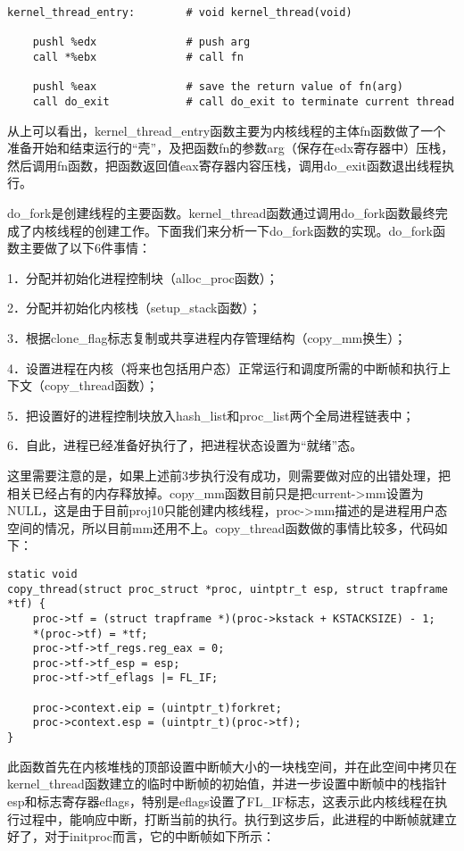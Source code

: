 \begin{lstlisting}
kernel_thread_entry:        # void kernel_thread(void)

    pushl %edx              # push arg
    call *%ebx              # call fn

    pushl %eax              # save the return value of fn(arg)
    call do_exit            # call do_exit to terminate current thread
\end{lstlisting}

从上可以看出，kernel\_thread\_entry函数主要为内核线程的主体fn函数做了一个准备开始和结束运行的``壳''，及把函数fn的参数arg（保存在edx寄存器中）压栈，然后调用fn函数，把函数返回值eax寄存器内容压栈，调用do\_exit函数退出线程执行。

do\_fork是创建线程的主要函数。kernel\_thread函数通过调用do\_fork函数最终完成了内核线程的创建工作。下面我们来分析一下do\_fork函数的实现。do\_fork函数主要做了以下6件事情：

1．分配并初始化进程控制块（alloc\_proc函数）；

2．分配并初始化内核栈（setup\_stack函数）；

3．根据clone\_flag标志复制或共享进程内存管理结构（copy\_mm换生）；

4．设置进程在内核（将来也包括用户态）正常运行和调度所需的中断帧和执行上下文（copy\_thread函数）；

5．把设置好的进程控制块放入hash\_list和proc\_list两个全局进程链表中；

6．自此，进程已经准备好执行了，把进程状态设置为``就绪''态。

这里需要注意的是，如果上述前3步执行没有成功，则需要做对应的出错处理，把相关已经占有的内存释放掉。copy\_mm函数目前只是把current-\textgreater{}mm设置为NULL，这是由于目前proj10只能创建内核线程，proc-\textgreater{}mm描述的是进程用户态空间的情况，所以目前mm还用不上。copy\_thread函数做的事情比较多，代码如下：

\begin{lstlisting}
static void
copy_thread(struct proc_struct *proc, uintptr_t esp, struct trapframe *tf) {
    proc->tf = (struct trapframe *)(proc->kstack + KSTACKSIZE) - 1;
    *(proc->tf) = *tf;
    proc->tf->tf_regs.reg_eax = 0;
    proc->tf->tf_esp = esp;
    proc->tf->tf_eflags |= FL_IF;

    proc->context.eip = (uintptr_t)forkret;
    proc->context.esp = (uintptr_t)(proc->tf);
}
\end{lstlisting}

此函数首先在内核堆栈的顶部设置中断帧大小的一块栈空间，并在此空间中拷贝在kernel\_thread函数建立的临时中断帧的初始值，并进一步设置中断帧中的栈指针esp和标志寄存器eflags，特别是eflags设置了FL\_IF标志，这表示此内核线程在执行过程中，能响应中断，打断当前的执行。执行到这步后，此进程的中断帧就建立好了，对于initproc而言，它的中断帧如下所示：

